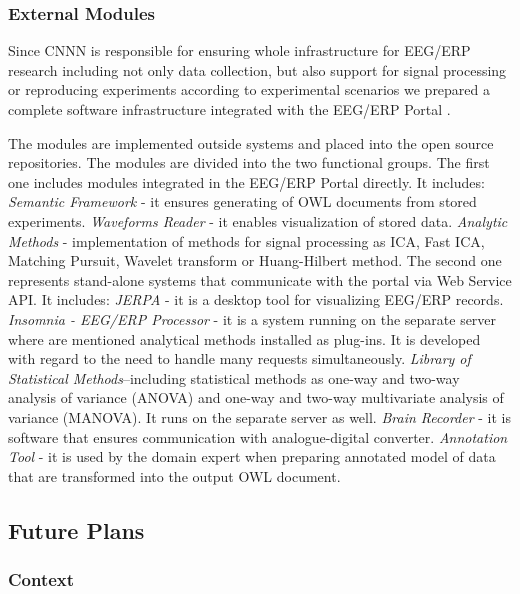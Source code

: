 \documentclass[a4paper, 10pt]{article}
\begin{document}
\subsubsection*{External Modules}

Since CNNN is responsible for ensuring  whole infrastructure for EEG/ERP research including not only data collection, but also support for signal processing or reproducing experiments according to experimental scenarios we prepared a complete software infrastructure integrated with the EEG/ERP Portal \cite{DBLP:conf/ic3k/MoucekJJP11, Overview-of-neuroinformatics-infrastructure-in-Pilsen}.

The modules are implemented outside systems and placed into the open source repositories. The modules are divided into the two functional groups. The first one includes modules integrated in the EEG/ERP Portal directly. It includes: \textit{Semantic Framework} - it ensures generating of OWL documents from stored experiments. \textit{Waveforms Reader} - it enables visualization of stored data. \textit{Analytic Methods} - implementation of methods for signal processing as ICA, Fast ICA, Matching Pursuit, Wavelet transform or Huang-Hilbert method. The second one represents stand-alone systems that communicate with the portal via Web Service API. It includes: \textit{JERPA} \cite{DBLP:conf/biostec/JezekM11} - it is a desktop tool for visualizing EEG/ERP records. \textit{Insomnia - EEG/ERP Processor} - it is a system running on the separate server where are mentioned analytical methods installed as plug-ins. It is developed with regard to the need to handle many requests simultaneously. \textit{Library of Statistical Methods}--including statistical methods as one-way and two-way analysis of variance (ANOVA) and one-way and two-way multivariate analysis of variance (MANOVA). It runs on the separate server as well. \textit{Brain Recorder} - it is  software that ensures communication with analogue-digital converter. \textit{Annotation Tool} - it is used by the domain expert when preparing annotated model of data that are transformed into the output OWL document.



\subsection*{Future Plans}

\subsubsection*{Context}
\end{document}
